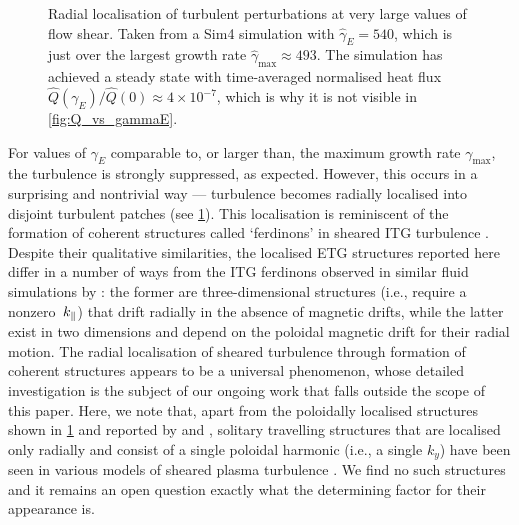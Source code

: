 \documentclass{jpp}
\newcommand{\gammaE}{\gamma_{E}}
\newcommand{\gammaEhat}{\hat{\gamma}_{E}}
\begin{document}
\begin{figure}
	\centering
	\caption{Radial localisation of turbulent perturbations at very large values of flow shear. Taken from a Sim4 simulation with \(\gammaEhat = 540\), which is just over the largest growth rate \(\hat{\gamma}_\text{max} \approx 493\). The simulation has achieved a steady state with time-averaged normalised heat flux \(\hat{Q}(\gammaE)/\hat{Q}(0) \approx 4 \times 10^{-7}\), which is why it is not visible in \cref{fig:Q_vs_gammaE}.}
	\label{fig:etg_ferds}
\end{figure}



For values of \(\gammaE\) comparable to, or larger than, the maximum growth rate \(\gamma_\text{max}\), the turbulence is strongly suppressed, as expected. However, this occurs in a surprising and nontrivial way --- turbulence becomes radially localised into disjoint turbulent patches (see \cref{fig:etg_ferds}). This localisation is reminiscent of the formation of coherent structures called `ferdinons' in sheared ITG turbulence \citep{vanwyk2016, vanwyk2017, ivanov20}. Despite their qualitative similarities, the localised ETG structures reported here differ in a number of ways from the ITG ferdinons observed in similar fluid simulations by \citet{ivanov20}: the former are three-dimensional structures (i.e., require a \mbox{nonzero \(k_\parallel\))} that drift radially in the absence of magnetic drifts, while the latter exist in two dimensions and depend on the poloidal magnetic drift for their radial motion. The radial localisation of sheared turbulence through formation of coherent structures appears to be a universal phenomenon, whose detailed investigation is the subject of our ongoing work that falls outside the scope of this paper. Here, we note that, apart from the poloidally localised structures shown in \cref{fig:etg_ferds} and reported by \citet{vanwyk2016} and \citet{ivanov20}, solitary travelling structures that are localised only radially and consist of a single poloidal harmonic (i.e., a single \(k_y\)) have been seen in various models of sheared plasma turbulence \citep{mcmillan09,mcmillan18,pringle17,zhou19_zf,zhou20}. We find no such structures and it remains an open question exactly what the determining factor for their appearance is.
\end{document}
